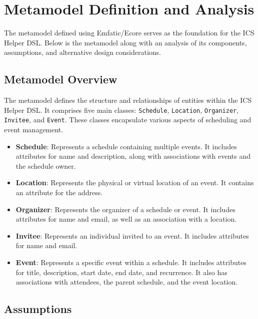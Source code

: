 \documentclass[12pt, letterpaper, twoside]{article}
\begin{document}
\section{Metamodel Definition and Analysis}

The metamodel defined using Emfatic/Ecore serves as the foundation for the ICS Helper DSL. Below is the metamodel along with an analysis of its components, assumptions, and alternative design considerations.

\subsection{Metamodel Overview}

The metamodel defines the structure and relationships of entities within the ICS Helper DSL. It comprises five main classes: \texttt{Schedule}, \texttt{Location}, \texttt{Organizer}, \texttt{Invitee}, and \texttt{Event}. These classes encapsulate various aspects of scheduling and event management.

\begin{itemize}
    \item \textbf{Schedule}: Represents a schedule containing multiple events. It includes attributes for name and description, along with associations with events and the schedule owner.
    
    \item \textbf{Location}: Represents the physical or virtual location of an event. It contains an attribute for the address.
    
    \item \textbf{Organizer}: Represents the organizer of a schedule or event. It includes attributes for name and email, as well as an association with a location.
    
    \item \textbf{Invitee}: Represents an individual invited to an event. It includes attributes for name and email.
    
    \item \textbf{Event}: Represents a specific event within a schedule. It includes attributes for title, description, start date, end date, and recurrence. It also has associations with attendees, the parent schedule, and the event location.
\end{itemize}

\subsection{Assumptions}
\end{document}
